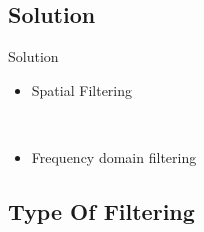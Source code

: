 \documentclass{beamer}
\begin{document}
		
		



\subsection{Solution}

\begin{frame}{Solution}

\begin{itemize}
	\item Spatial Filtering
	

	
	\
	
	\item  Frequency domain filtering



	
	
\end{itemize}

\end{frame}

\subsection{Type Of Filtering}
\end{document}
